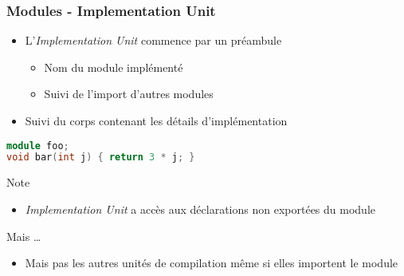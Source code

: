 \documentclass[C++.tex]{subfiles}
\begin{document}
\begin{frame}[fragile]
	\frametitle{Modules - Implementation Unit}
	\begin{itemize}
		\item L'\textit{Implementation Unit} commence par un préambule
		\begin{itemize}
			\item Nom du module implémenté
			\item Suivi de l'import d'autres modules
		\end{itemize}
		\item Suivi du corps contenant les détails d'implémentation
	\end{itemize}

	\begin{lstlisting}[language=C++]
module foo;
void bar(int j) { return 3 * j; }\end{lstlisting}

	\begin{block}{Note}
		\begin{itemize}
			\item \textit{Implementation Unit} a accès aux déclarations non exportées du module
		\end{itemize}

	\end{block}

	\pause

	\begin{alertblock}{Mais \ldots{}}
		\begin{itemize}
			\item Mais pas les autres unités de compilation même si elles importent le module
		\end{itemize}
	\end{alertblock}
\end{frame}
\end{document}
